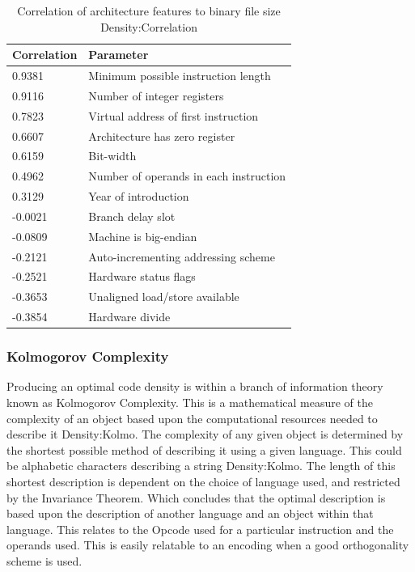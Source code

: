 \documentclass[12pt,a4paper]{article}
\begin{document}
\begin{table}[htb]
	\centering
	\footnotesize
	\begin{tabular}{|p{2.5cm}|l|}
	\hline \textbf{Correlation} & \textbf{Parameter} \\ \hline
	0.9381 & Minimum possible instruction length \\
	0.9116 & Number of integer registers \\ 
	0.7823 & Virtual address of first instruction \\
	0.6607 & Architecture has zero register \\
	0.6159 & Bit-width \\
	0.4962 & Number of operands in each instruction \\
	0.3129 & Year of introduction \\ \hline 
	-0.0021 & Branch delay slot \\
	-0.0809 & Machine is big-endian \\
	-0.2121 & Auto-incrementing addressing scheme \\
	-0.2521 & Hardware status flags \\
	-0.3653 & Unaligned load/store available \\
	-0.3854 & Hardware divide \\ \hline
	\end{tabular}
	\caption{\label{tab:Correlation}Correlation of architecture features to binary file size \cite{ref}{Density:Correlation}}
\end{table}

\subsubsection{Kolmogorov Complexity}
Producing an optimal code density is within a branch of information theory known as Kolmogorov Complexity. This is a mathematical measure of the complexity of an object based upon the computational resources needed to describe it \cite{ref}{Density:Kolmo}. The complexity of any given object is determined by the shortest possible method of describing it using a given language. This could be alphabetic characters describing a string \cite{ref}{Density:Kolmo}. The length of this shortest description is dependent on the choice of language used, and restricted by the Invariance Theorem. Which concludes that the optimal description is based upon the description of another language and an object within that language. This relates to the Opcode used for a particular instruction and the operands used. This is easily relatable to an encoding when a good orthogonality scheme is used. 
\end{document}
